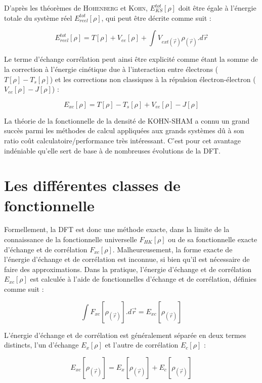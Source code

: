 D'après les théorèmes de \textsc{Hohenberg} et \textsc{Kohn}, $E_{KS}^{tot}[\rho]$ doit être égale à l'énergie totale du système réel $E_{reel}^{tot}[\rho]$, qui peut être décrite comme suit :

\begin{equation}
E_{reel}^{tot}[\rho] = T[\rho] + V_{ee}[\rho] + \int V_{ext(\vec{r})}\rho_{(\vec{r})} .d\vec{r}
\end{equation}

Le terme d'échange corrélation peut ainsi être explicité comme étant la somme de la correction à l'énergie cinétique due à l'interaction entre électrons ($T[\rho] - T_{s}[\rho]$) et les corrections non classiques à la répulsion électron-électron ($V_{ee}[\rho] - J[\rho]$) :

\begin{equation}
E_{xc}[\rho] = T[\rho] - T_{s}[\rho] + V_{ee}[\rho] - J[\rho]
\end{equation}

La théorie de la fonctionnelle de la densité de KOHN-SHAM a connu un grand succès parmi les méthodes de calcul appliquées aux grands systèmes dû à son ratio coût calculatoire/performance très intéressant. C'est pour cet avantage indéniable qu'elle sert de base à de nombreuses évolutions de la DFT.

\section{Les différentes classes de fonctionnelle}

Formellement, la DFT est donc une méthode exacte, dans la limite de la connaissance de la fonctionnelle universelle $F_{HK}[\rho]$ ou de sa fonctionnelle exacte d’échange et de corrélation $F_{xc}[\rho]$. Malheureusement, la forme exacte de l’énergie d’échange et de corrélation est inconnue, si bien qu’il est nécessaire de faire des approximations. Dans la pratique, l’énergie d’échange et de corrélation $E_{xc}[\rho]$ est calculée à l’aide de fonctionnelles d’échange et de corrélation, définies comme suit :

\begin{equation}
\int F_{xc}[\rho_{(\vec{r})}].d\vec{r} = E_{xc}[\rho_{(\vec{r})}]
\end{equation}

L’énergie d’échange et de corrélation est généralement séparée en deux termes distincts, l’un d’échange $E_{x}[\rho]$ et l’autre de corrélation $E_{c}[\rho]$ :

\begin{equation}
E_{xc}[\rho_{(\vec{r})}] = E_{x}[\rho_{(\vec{r})}] + E_{c}[\rho_{(\vec{r})}]
\end{equation}

